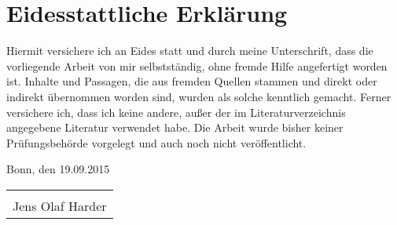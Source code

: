 \section*{Eidesstattliche Erklärung}

Hiermit versichere ich an Eides statt und durch meine Unterschrift, dass die vorliegende Arbeit von mir selbstständig, ohne fremde Hilfe angefertigt worden ist. Inhalte und Passagen, die aus fremden Quellen stammen und direkt oder indirekt übernommen worden sind, wurden als solche kenntlich gemacht. Ferner versichere ich, dass ich keine andere, außer der im Literaturverzeichnis angegebene Literatur verwendet habe. Die Arbeit wurde bisher keiner Prüfungsbehörde vorgelegt und auch noch nicht veröffentlicht.

\vspace{1cm}
Bonn, den 19.09.2015
\vspace{1cm}

\begin{tabular}{l}
    \hspace{6cm} \\
    \cline{1-1}
    \hspace{0.5cm}Jens Olaf Harder
\end{tabular}
